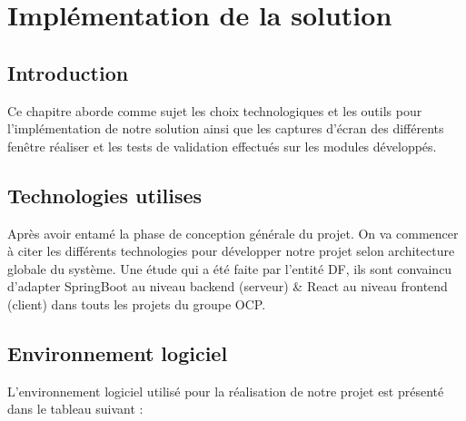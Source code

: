 \chapter{Impl\'ementation de la solution}

\section{Introduction}

Ce chapitre aborde comme sujet les choix technologiques et les outils pour l'impl\'ementation de notre solution ainsi que les captures d'\'ecran des diff\'erents fen\^etre r\'ealiser et les tests de validation effectu\'es sur les modules d\'evelopp\'es.

\section{Technologies utilises}

Apr\`es avoir entam\'e la phase de conception g\'en\'erale du projet. On va commencer \`a citer  les diff\'erents technologies pour d\'evelopper notre projet selon architecture globale du syst\`eme. Une \'etude qui a \'et\'e faite par l'entit\'e \gls{DF}, ils sont convaincu d'adapter \textcolor{spring}{SpringBoot} au niveau backend (serveur) \& \textcolor{react}{React} au niveau frontend (client) dans touts les projets du groupe \gls{OCP}.

\section{Environnement logiciel}
L'environnement logiciel utilis\'e pour la r\'ealisation de notre projet est pr\'esent\'e dans le tableau suivant :

